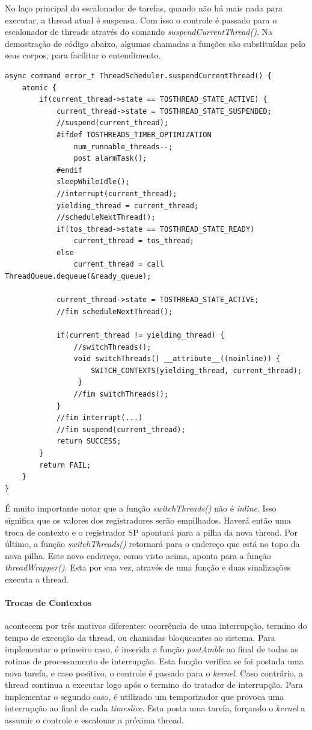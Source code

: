 No laço principal do escalonador de tarefas, quando não há mais nada para executar, a thread atual é suspensa. Com isso
o controle é passado para o escalonador de threads através do comando \textit{suspendCurrentThread()}. Na demostração de
código abaixo, algumas chamadas a funções são substituídas pelo seus corpos, para facilitar o entendimento.
\begin{lstlisting}
async command error_t ThreadScheduler.suspendCurrentThread() {
    atomic {
        if(current_thread->state == TOSTHREAD_STATE_ACTIVE) {
            current_thread->state = TOSTHREAD_STATE_SUSPENDED;
            //suspend(current_thread);
            #ifdef TOSTHREADS_TIMER_OPTIMIZATION
                num_runnable_threads--;
                post alarmTask();
            #endif
            sleepWhileIdle();
            //interrupt(current_thread);
            yielding_thread = current_thread;
            //scheduleNextThread();
            if(tos_thread->state == TOSTHREAD_STATE_READY)
                current_thread = tos_thread;
            else
                current_thread = call ThreadQueue.dequeue(&ready_queue);

            current_thread->state = TOSTHREAD_STATE_ACTIVE;
            //fim scheduleNextThread();

            if(current_thread != yielding_thread) {
                //switchThreads();
                void switchThreads() __attribute__((noinline)) {
                    SWITCH_CONTEXTS(yielding_thread, current_thread);
                 }
                //fim switchThreads();
            }
            //fim interrupt(...)
            //fim suspend(current_thread);
            return SUCCESS;
        }
        return FAIL;
    }
}
\end{lstlisting}
É muito importante notar que a função \textit{switchThreads()} não é \textit{inline}. Isso significa que os valores dos
registradores serão empilhados. Haverá então uma troca de contexto e o registrador SP apontará para a pilha da nova
thread. Por último, a função \textit{switchThreads()} retornará para o endereço que está no topo da nova pilha. Este
novo endereço, como visto acima, aponta para a função \textit{threadWrapper()}. Esta por sua vez, através de uma função
e duas sinalizações executa a thread.

\paragraph{Trocas de Contextos}
acontecem por três motivos diferentes: ocorrência de uma interrupção, termino do tempo de execução da thread, ou chamadas
bloqueantes ao sistema. 
Para implementar o primeiro caso, é inserida a função \textit{postAmble} ao final de todas as rotinas de processamento
de interrupção. Esta função verifica se foi postada uma nova tarefa, e caso positivo, o controle é passado para o
\textit{kernel}. Caso contrário, a thread continua a executar logo após o termino do tratador de interrupção.
Para implementar o segundo caso, é utilizado um temporizador que provoca uma interrupção ao final de cada
\textit{timeslice}. Esta posta uma tarefa, forçando o \textit{kernel} a assumir o controle e escalonar a próxima thread.

